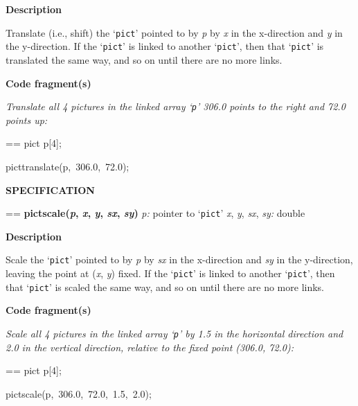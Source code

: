 \documentclass{book}
\makeatletter
\newcommand\Texinfocommandstyletextvar[1]{{\normalfont{}\textsl{#1}}}%
\newenvironment{Texinfopreformatted}{%
  \par\GNUTobeylines\obeyspaces\frenchspacing\parskip=\z@\parindent=\z@}{}
{\catcode`\^^M=13 \gdef\GNUTobeylines{\catcode`\^^M=13 \def^^M{\null\par}}}
\newenvironment{Texinfoindented}{\begin{list}{}{}\item\relax}{\end{list}}
\renewcommand{\_}{\Texinfounderscore\discretionary{}{}{}}
\makeatother
\begin{document}
\noindent{}\textbf{Description}

Translate (i.e., shift)
the `\texttt{pict}' pointed to by \Texinfocommandstyletextvar{p} by \Texinfocommandstyletextvar{x} in the x-direction and
\Texinfocommandstyletextvar{y} in the y-direction.
If the `\texttt{pict}' is linked to another `\texttt{pict}', then that `\texttt{pict}' is translated the same
way, and so on until there are no more links.

\noindent{}\textbf{Code fragment(s)}

\emph{Translate all 4 pictures in the linked array
`\texttt{p}' 306.0 points to the right and 72.0 points up:}
\begin{Texinfoindented}
\begin{Texinfopreformatted}%
\ttfamily pict p[4];

pict\_translate(p,\ 306.0,\ 72.0);
\end{Texinfopreformatted}
\end{Texinfoindented}

\noindent{}\textbf{SPECIFICATION}
\begin{Texinfoindented}
\begin{Texinfopreformatted}%
\textbf{pict\_scale(\Texinfocommandstyletextvar{p}, \Texinfocommandstyletextvar{x}, \Texinfocommandstyletextvar{y}, \Texinfocommandstyletextvar{sx}, \Texinfocommandstyletextvar{sy})}
\Texinfocommandstyletextvar{p:} pointer to `\texttt{pict}'
\Texinfocommandstyletextvar{x}, \Texinfocommandstyletextvar{y}, \Texinfocommandstyletextvar{sx}, \Texinfocommandstyletextvar{sy:} double
\end{Texinfopreformatted}
\end{Texinfoindented}
%
%
%
%
%
%
%

\noindent{}\textbf{Description}

Scale the `\texttt{pict}' pointed to by \Texinfocommandstyletextvar{p} by \Texinfocommandstyletextvar{sx} in the x-direction and
\Texinfocommandstyletextvar{sy} in the y-direction, leaving the point at
(\Texinfocommandstyletextvar{x}, \Texinfocommandstyletextvar{y}) fixed.
If the `\texttt{pict}' is linked to another `\texttt{pict}', then that `\texttt{pict}' is scaled the same
way, and so on until there are no more links.

\noindent{}\textbf{Code fragment(s)}

\emph{Scale all 4 pictures in the linked array
`\texttt{p}' by 1.5 in the horizontal direction
and 2.0 in the vertical direction,
relative to the fixed point (306.0, 72.0):}
\begin{Texinfoindented}
\begin{Texinfopreformatted}%
\ttfamily pict p[4];

pict\_scale(p,\ 306.0,\ 72.0,\ 1.5,\ 2.0);
\end{Texinfopreformatted}
\end{Texinfoindented}
\end{document}
